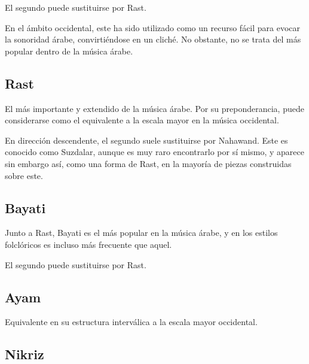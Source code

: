 

El segundo \yins puede sustituirse por \yins Rast.



En el ámbito occidental, este \maqam ha sido utilizado como un recurso fácil para evocar la sonoridad árabe, convirtiéndose en un cliché. No obstante, no se trata del \maqam más popular dentro de la música árabe.

\subsection{\Maqam Rast}

El \maqam más importante y extendido de la música árabe. Por su preponderancia, puede considerarse como el equivalente a la escala mayor en la música occidental.



En dirección descendente, el segundo \yins suele sustituirse por \yins Nahawand. Este \maqam es conocido como \maqam Suzdalar, aunque es muy raro encontrarlo por sí mismo, y aparece sin embargo así, como una forma de \maqam Rast, en la mayoría de piezas construidas sobre este.



\subsection{\Maqam Bayati}

Junto a Rast, Bayati es el \maqam más popular en la música árabe, y en los estilos folclóricos es incluso más frecuente que aquel.



El segundo \yins puede sustituirse por \yins Rast.



\subsection{\Maqam Ayam}

Equivalente en su estructura interválica a la escala mayor occidental.



\subsection{\Maqam Nikriz}

